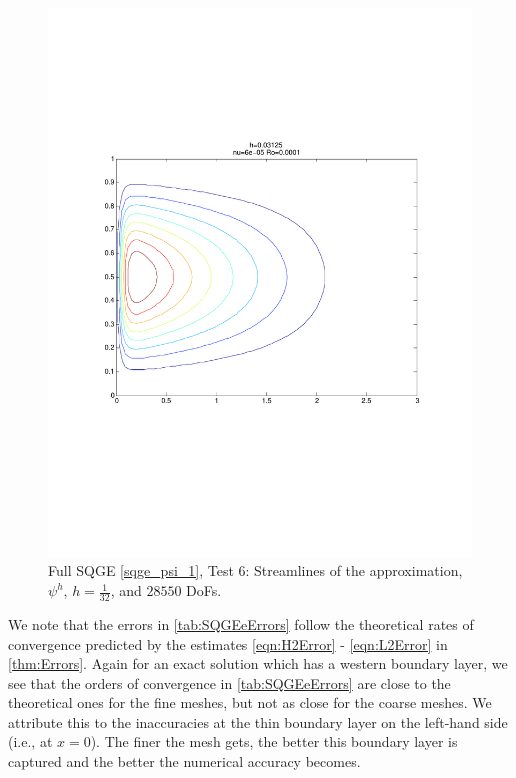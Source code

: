 \begin{figure}[H]
  \begin{center}
    \includegraphics[trim=0 200 20 215, clip=true, scale=0.5]{SQGEe.pdf}
    \caption{Full SQGE \eqref{sqge_psi_1}, Test 6: Streamlines of the approximation,
    $\psi^h$, $h=\frac{1}{32}$, and $28550$ DoFs.}
    \label{fig:SQGEe}
  \end{center}
\end{figure}

We note that the errors in \autoref{tab:SQGEeErrors} follow the theoretical rates of convergence
predicted by the estimates \eqref{eqn:H2Error} - \eqref{eqn:L2Error} in \autoref{thm:Errors}. Again
for an exact solution which has a western boundary layer, we see that the orders of convergence in \autoref{tab:SQGEeErrors} are close to the theoretical ones for the fine meshes, but
not as close for the coarse meshes. We attribute this to the inaccuracies at the thin boundary layer
on the left-hand side (i.e., at $x=0$). The finer the mesh gets, the better this boundary layer is
captured and the better the numerical accuracy becomes.
